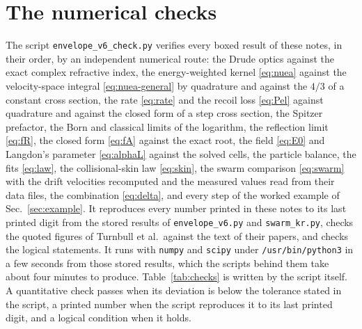 \documentclass[11pt]{article}
\numberwithin{equation}{section}
\begin{document}
\section{The numerical checks}
\label{app:checks}
The script \texttt{envelope\_v6\_check.py} verifies every boxed result of these notes, in
their order, by an independent numerical route: the Drude optics against the exact
complex refractive index, the energy-weighted kernel \eqref{eq:nuea} against the
velocity-space integral \eqref{eq:nuea-general} by quadrature and against the $4/3$ of a
constant cross section, the rate \eqref{eq:rate} and the recoil loss \eqref{eq:Pel}
against quadrature and against the closed form of a step cross section, the Spitzer
prefactor, the Born and classical limits of the logarithm, the reflection limit
\eqref{eq:fR}, the closed form \eqref{eq:fA} against the exact root, the field
\eqref{eq:E0} and Langdon's parameter \eqref{eq:alphaL} against the solved cells, the
particle balance, the fits \eqref{eq:law}, the collisional-skin law \eqref{eq:skin}, the
swarm comparison \eqref{eq:swarm} with the drift velocities recomputed and the measured values read
from their data files, the combination \eqref{eq:delta}, and every step of the worked example of Sec.~\ref{sec:example}. It
reproduces every number printed in these notes to its last printed digit from the stored results
of \texttt{envelope\_v6.py} and \texttt{swarm\_kr.py}, checks the quoted figures of Turnbull et al.\ against the text of
their papers, and checks the logical statements. It runs with \texttt{numpy} and \texttt{scipy}
under \texttt{/usr/bin/python3} in a few seconds from those stored results, which the scripts
behind them take about four minutes to produce. Table~\ref{tab:checks} is
written by the script itself. A quantitative check passes when its deviation is below
the tolerance stated in the script, a printed number when the script reproduces it to
its last printed digit, and a logical condition when it holds.


\end{document}
